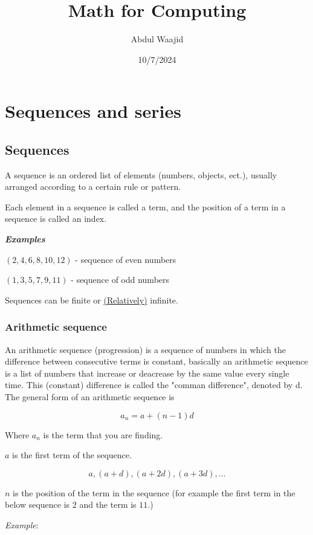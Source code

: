 \documentclass[]{article}
\title{Math for Computing}
\author{Abdul Waajid}
\date{10/7/2024}
\begin{document}
\maketitle


\section{Sequences and series}

\subsection{Sequences}

A sequence is an ordered list of elements (numbers, objects, ect.), usually arranged according to a certain rule or pattern.

Each element in a sequence is called a term, and the position of a term in a sequence is called an index.

\textbf{\textit{Examples}}

$(2, 4, 6, 8, 10, 12)$ - sequence of even numbers

$(1, 3, 5, 7, 9, 11)$ - sequence of odd numbers

Sequences can be finite or \href{https://chatgpt.com/share/67036ea9-4ee4-8013-807b-503ab41d091b}{(Relatively)} infinite.

\subsubsection{Arithmetic sequence}

An arithmetic sequence (progression) is a sequence of numbers in which the difference between consecutive terms is constant,
basically an arithmetic sequence is a list of numbers that increase or deacrease by the same value every single time. 
This (constant) difference is called the "comman 
difference", denoted by d. The general form of an arithmetic sequence is 


$$ a_{n} = a + (n-1)d$$

Where $ a_{n}$ is the term that you are finding.

$a$ is the first term of the sequence.

$$ a, (a+d), (a+2d), (a+3d), ...  $$  

$n$ is the position of the term in the sequence (for example the first term in the below sequence is $2$ and the term is $11$.)

\vspace{0.5 cm}
\textit{Example}: 
\end{document}
